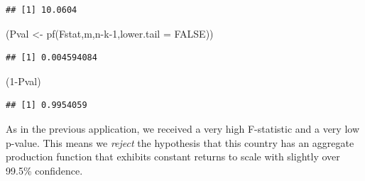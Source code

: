 \documentclass[
]{book}
\newenvironment{Shaded}{\begin{snugshade}}{\end{snugshade}}
\newcommand{\AttributeTok}[1]{\textcolor[rgb]{0.77,0.63,0.00}{#1}}
\newcommand{\ConstantTok}[1]{\textcolor[rgb]{0.00,0.00,0.00}{#1}}
\newcommand{\DecValTok}[1]{\textcolor[rgb]{0.00,0.00,0.81}{#1}}
\newcommand{\FunctionTok}[1]{\textcolor[rgb]{0.00,0.00,0.00}{#1}}
\newcommand{\NormalTok}[1]{#1}
\newcommand{\OtherTok}[1]{\textcolor[rgb]{0.56,0.35,0.01}{#1}}
\newcommand{\SpecialCharTok}[1]{\textcolor[rgb]{0.00,0.00,0.00}{#1}}
\begin{document}
\begin{verbatim}
## [1] 10.0604
\end{verbatim}

\begin{Shaded}
\begin{Highlighting}[]
\NormalTok{(Pval }\OtherTok{\textless{}{-}} \FunctionTok{pf}\NormalTok{(Fstat,m,n}\SpecialCharTok{{-}}\NormalTok{k}\DecValTok{{-}1}\NormalTok{,}\AttributeTok{lower.tail =} \ConstantTok{FALSE}\NormalTok{))}
\end{Highlighting}
\end{Shaded}

\begin{verbatim}
## [1] 0.004594084
\end{verbatim}

\begin{Shaded}
\begin{Highlighting}[]
\NormalTok{(}\DecValTok{1}\SpecialCharTok{{-}}\NormalTok{Pval)}
\end{Highlighting}
\end{Shaded}

\begin{verbatim}
## [1] 0.9954059
\end{verbatim}

As in the previous application, we received a very high F-statistic and a very low p-value. This means we \emph{reject} the hypothesis that this country has an aggregate production function that exhibits constant returns to scale with slightly over 99.5\% confidence.
\end{document}
